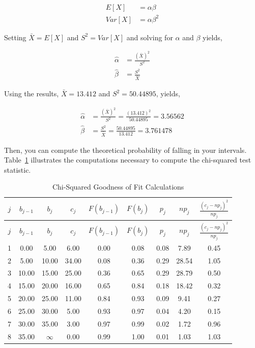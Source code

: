 \documentclass[
]{book}
\theoremstyle{definition}
\theoremstyle{definition}
\theoremstyle{definition}
\theoremstyle{definition}
\theoremstyle{remark}
\begin{document}
\[
\begin{aligned}
E[X] & = \alpha \beta \\
Var[X] & = \alpha \beta^{2}
\end{aligned}
\]

Setting \(\bar{X} = E[X]\) and \(S^{2} = Var[X]\) and solving for \(\alpha\) and
\(\beta\) yields,

\[
\begin{aligned}
\hat{\alpha}  & = \frac{(\bar{X})^2}{S^{2}}\\
\hat{\beta} & = \frac{S^{2}}{\bar{X}}
\end{aligned}
\]

Using the results, \(\bar{X} = 13.412\) and \(S^{2} = 50.44895\), yields,

\[
\begin{aligned}
\hat{\alpha}  & = \frac{(\bar{X})^2}{S^{2}} = \frac{(13.412)^2}{50.44895} = 3.56562\\
\hat{\beta} & = \frac{S^{2}}{\bar{X}} = \frac{50.44895}{13.412} = 3.761478
\end{aligned}
\]

Then, you can compute the theoretical probability of falling in your
intervals. Table~\ref{tab:TaskTimeGOF} illustrates the computations necessary to
compute the chi-squared test statistic.

\hypertarget{tab:TaskTimeGOF}{}
\begin{longtable}[]{@{}ccccccccc@{}}
\caption{\label{tab:TaskTimeGOF} Chi-Squared Goodness of Fit Calculations}\tabularnewline
\toprule
\(j\) & \(b_{j-1}\) & \(b_{j}\) & \(c_{j}\) & \(F(b_{j-1})\) & \(F(b_{j})\) & \(p_j\) & \(np_{j}\) & \(\frac{\left( c_{j} - np_{j} \right)^{2}}{np_{j}}\) \\
\midrule
\endfirsthead
\toprule
\(j\) & \(b_{j-1}\) & \(b_{j}\) & \(c_{j}\) & \(F(b_{j-1})\) & \(F(b_{j})\) & \(p_j\) & \(np_{j}\) & \(\frac{\left( c_{j} - np_{j} \right)^{2}}{np_{j}}\) \\
\midrule
\endhead
1 & 0.00 & 5.00 & 6.00 & 0.00 & 0.08 & 0.08 & 7.89 & 0.45 \\
2 & 5.00 & 10.00 & 34.00 & 0.08 & 0.36 & 0.29 & 28.54 & 1.05 \\
3 & 10.00 & 15.00 & 25.00 & 0.36 & 0.65 & 0.29 & 28.79 & 0.50 \\
4 & 15.00 & 20.00 & 16.00 & 0.65 & 0.84 & 0.18 & 18.42 & 0.32 \\
5 & 20.00 & 25.00 & 11.00 & 0.84 & 0.93 & 0.09 & 9.41 & 0.27 \\
6 & 25.00 & 30.00 & 5.00 & 0.93 & 0.97 & 0.04 & 4.20 & 0.15 \\
7 & 30.00 & 35.00 & 3.00 & 0.97 & 0.99 & 0.02 & 1.72 & 0.96 \\
8 & 35.00 & \(\infty\) & 0.00 & 0.99 & 1.00 & 0.01 & 1.03 & 1.03 \\
\bottomrule
\end{longtable}
\end{document}
